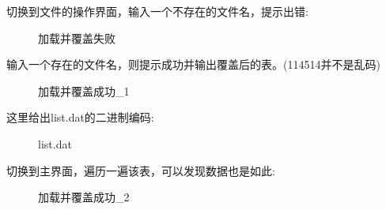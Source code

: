 \documentclass[supercite]{Experimental_Report}
\theoremstyle{definition}
\begin{document}
\clearpage
\noindent
切换到文件的操作界面，输入一个不存在的文件名，提示出错:
\begin{figure}[htbp]
	\centering
	\centering
	\caption{加载并覆盖失败}
	\label{fig3-10}
\end{figure}

\noindent
输入一个存在的文件名，则提示成功并输出覆盖后的表。(114514并不是乱码)
\begin{figure}[htbp]
	\centering
	\centering
	\caption{加载并覆盖成功\_1}
	\label{fig3-11}
\end{figure}

\noindent
这里给出list.dat的二进制编码:
\begin{figure}[htbp]
	\centering
	\centering
	\caption{list.dat}
	\label{fig3-12}
\end{figure}

\noindent
切换到主界面，遍历一遍该表，可以发现数据也是如此:
\begin{figure}[H]
	\centering
	\centering
	\caption{加载并覆盖成功\_2}
	\label{fig3-13}
\end{figure}
\end{document}
